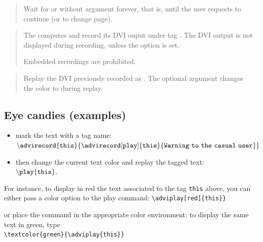 \documentclass[12pt]{article}
\begin{document}
\medskip\noindent
\docdef \adviwait{}
\begin{quote}
Wait for  or without argument forever, that is, until the
user requests to continue (or to change page).
\end{quote}

\medskip\noindent
\docdef \advirecord \doctt{[play]}
\begin{quote}
The computes  and record its DVI ouput under tag
. The DVI output is not displayed during recording, unless the
option  is set.

Embedded recordings are prohibited. 
\end{quote}

\medskip\noindent
\docdef \adviplay{}
\begin{quote}
Replay the DVI previously recorded as .
The optional argument changes the color to  during replay. 
\end{quote}


\newpage 

\subsection* {Eye candies (examples)}

\begin{itemize}
   \item mark the text with a tag name:\\
     $\tt \backslash advirecord\{this\}
      \{\advirecord[play]{this}{Warning~to~the~casual~user}\}$

   \item then change the current text color and replay the tagged text:\\
  $\tt{\backslash}play\{this\}$.
\end{itemize}


\noindent
For instance, to display in red the text associated to the tag
{\tt this} above, you can either pass a color option to the play command:
\verb+\adviplay[red]{this}}+\\
\adviwait%
\textcolor {c1}{}\adviwait
{}\adviwait

\noindent
or place the command in the appropriate color environment:
to display the same text in green, type\\
\verb+\textcolor{green}{\adviplay{this}}+\\
\adviwait
\textcolor{green}{\adviwait}
\end{document}
